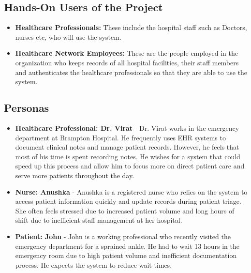 \documentclass[12pt]{article}
\begin{document}
\subsection{Hands-On Users of the Project}
\begin{itemize}
  \item\textbf{Healthcare Professionals:} These include the hospital staff such as Doctors, nurses etc, who will use the system.
  \item\textbf{Healthcare Network Employees:} These are the people employed in the organization who keeps records of all hospital facilities, their staff members and authenticates the healthcare professionals so that they are able to use the system. 
\end{itemize}

\subsection{Personas}
\begin{itemize}
    \item \textbf{Healthcare Professional: Dr. Virat} - Dr. Virat works in the emergency department at Brampton Hospital. He frequently uses EHR systems to document clinical notes and manage patient records. However, he feels that most of his time is spent recording notes. He wishes for a system that could speed up this process and allow him to focus more on direct patient care and serve more patients throughout the day.
    \item \textbf{Nurse: Anushka} - Anushka is a registered nurse who relies on the system to access patient information quickly and update records during patient triage. She often feels stressed due to increased patient volume and long hours of shift due to inefficient staff management at her hospital.
    \item \textbf{Patient: John} - John is a working professional who recently visited the emergency department for a sprained ankle. He had to wait 13 hours in the emergency room due to high patient volume and inefficient documentation process. He expects the system to reduce wait times.
\end{itemize}
\end{document}

